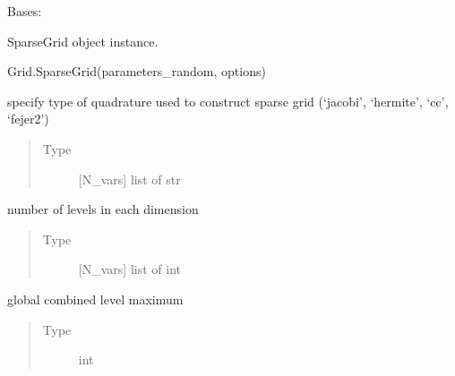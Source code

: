 \documentclass[letterpaper,10pt,english,openany,oneside]{sphinxmanual}
\begin{document}
\begin{fulllineitems}
\label{\detokenize{pygpc:pygpc.Grid.SparseGrid}}
Bases: {\hyperref[\detokenize{pygpc:pygpc.Grid.Grid}]{}}

SparseGrid object instance.

Grid.SparseGrid(parameters\_random, options)

\begin{fulllineitems}
\label{\detokenize{pygpc:pygpc.Grid.SparseGrid.grid_type}}
specify type of quadrature used to construct sparse grid (‘jacobi’, ‘hermite’, ‘cc’, ‘fejer2’)
\begin{quote}\begin{description}
\item[{Type}] \leavevmode
{[}N\_vars{]} list of str

\end{description}\end{quote}

\end{fulllineitems}


\begin{fulllineitems}
\label{\detokenize{pygpc:pygpc.Grid.SparseGrid.level}}
number of levels in each dimension
\begin{quote}\begin{description}
\item[{Type}] \leavevmode
{[}N\_vars{]} list of int

\end{description}\end{quote}

\end{fulllineitems}


\begin{fulllineitems}
\label{\detokenize{pygpc:pygpc.Grid.SparseGrid.level_max}}
global combined level maximum
\begin{quote}\begin{description}
\item[{Type}] \leavevmode
int


\end{description}
\end{quote}
\end{fulllineitems}
\end{fulllineitems}
\end{document}
